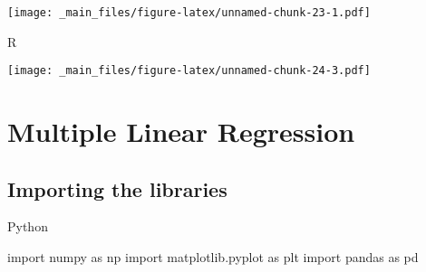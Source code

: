 \documentclass[
]{book}
\newenvironment{Shaded}{\begin{snugshade}}{\end{snugshade}}
\newcommand{\AttributeTok}[1]{\textcolor[rgb]{0.77,0.63,0.00}{#1}}
\newcommand{\CommentTok}[1]{\textcolor[rgb]{0.56,0.35,0.01}{\textit{#1}}}
\newcommand{\FunctionTok}[1]{\textcolor[rgb]{0.00,0.00,0.00}{#1}}
\newcommand{\ImportTok}[1]{#1}
\newcommand{\NormalTok}[1]{#1}
\newcommand{\SpecialCharTok}[1]{\textcolor[rgb]{0.00,0.00,0.00}{#1}}
\newcommand{\StringTok}[1]{\textcolor[rgb]{0.31,0.60,0.02}{#1}}
\theoremstyle{definition}
\theoremstyle{definition}
\theoremstyle{definition}
\theoremstyle{definition}
\theoremstyle{remark}
\begin{document}
\texttt{[image: \_main\_files/figure-latex/unnamed-chunk-23-1.pdf]}

R

\begin{Shaded}
\end{Shaded}

\texttt{[image: \_main\_files/figure-latex/unnamed-chunk-24-3.pdf]}

\hypertarget{multiple-linear-regression}{%
\section{Multiple Linear Regression}\label{multiple-linear-regression}}

\hypertarget{importing-the-libraries-2}{%
\subsection{Importing the libraries}\label{importing-the-libraries-2}}

Python

\begin{Shaded}
\begin{Highlighting}[]
\ImportTok{import}\NormalTok{ numpy }\ImportTok{as}\NormalTok{ np}
\ImportTok{import}\NormalTok{ matplotlib.pyplot }\ImportTok{as}\NormalTok{ plt}
\ImportTok{import}\NormalTok{ pandas }\ImportTok{as}\NormalTok{ pd}
\end{Highlighting}
\end{Shaded}
\end{document}
